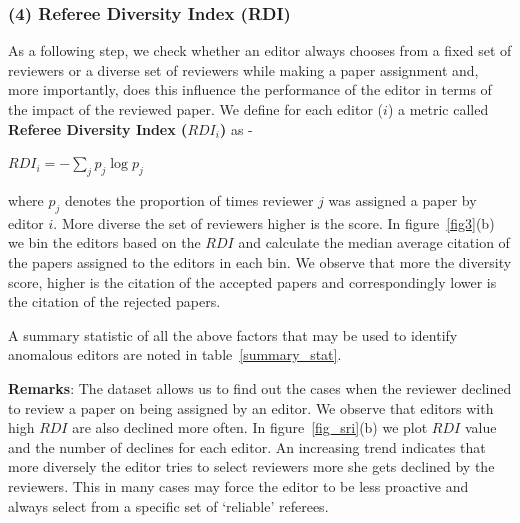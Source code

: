 \subsubsection*{(4) Referee Diversity Index (RDI)}
As a following step, we check whether an editor always chooses from a fixed set of reviewers or a diverse set of reviewers while making a paper assignment and, more importantly, does this influence the performance of the editor in terms of the impact of the reviewed paper. We define for each editor ($i$) a metric called {\bf Referee Diversity Index ($RDI_{i}$)} as -  
\begin{center}
$RDI_{i}=-\sum \limits_{j} p_{j}\log p_{j}$
\end{center}
where $p_{j}$ denotes the proportion of times reviewer $j$ was assigned a paper by editor $i$. More diverse the set of reviewers higher is the score. In figure~\ref{fig3}(b) we bin the editors based on the $RDI$ and calculate the median average citation of the papers assigned to the editors in each bin. We observe that more the diversity score, higher is the citation of the accepted papers and correspondingly lower is the citation of the rejected papers.

A summary statistic of all the above factors that may be used to identify anomalous editors are noted in table~\ref{summary_stat}.

{\bf Remarks}: The dataset allows us to find out the cases when the reviewer declined to review a paper on being assigned by an editor. We observe that editors with high $RDI$ are also declined more often. In figure~\ref{fig_sri}(b) we plot $RDI$ value and the number of declines for each editor. An increasing trend indicates that more diversely the editor tries to select reviewers more she gets declined by the reviewers. This in many cases may force the editor to be less proactive and always select from a specific set of `reliable' referees.  


